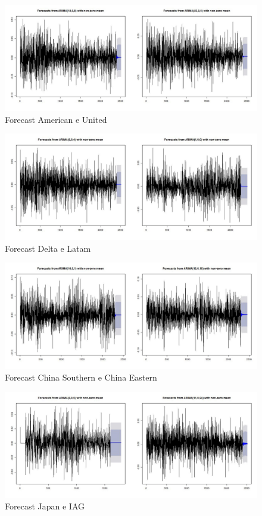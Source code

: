 \documentclass[12pt]{article}
\begin{document}
\begin{figure}[H]
	\centering
	\includegraphics[width=0.9\linewidth]{../Modelos/ForecastAmerUnit}
	\caption{Forecast American e United}
	\label{fig:forecastamerunit}
\end{figure}
\begin{figure}[H]
	\centering
	\includegraphics[width=0.9\linewidth]{../Modelos/ForecastDeltaLat}
	\caption{Forecast Delta e Latam}
	\label{fig:forecastdeltalat}
\end{figure}
\begin{figure}[H]
	\centering
	\includegraphics[width=0.9\linewidth]{../Modelos/ForecastChinaSoEast}
	\caption{Forecast China Southern e China Eastern}
	\label{fig:forecastchinasoeast}
\end{figure}
\begin{figure}[H]
	\centering
	\includegraphics[width=0.9\linewidth]{../Modelos/ForecastJpIAG}
	\caption{Forecast Japan e IAG}
	\label{fig:forecastjpiag}
\end{figure}
\end{document}
